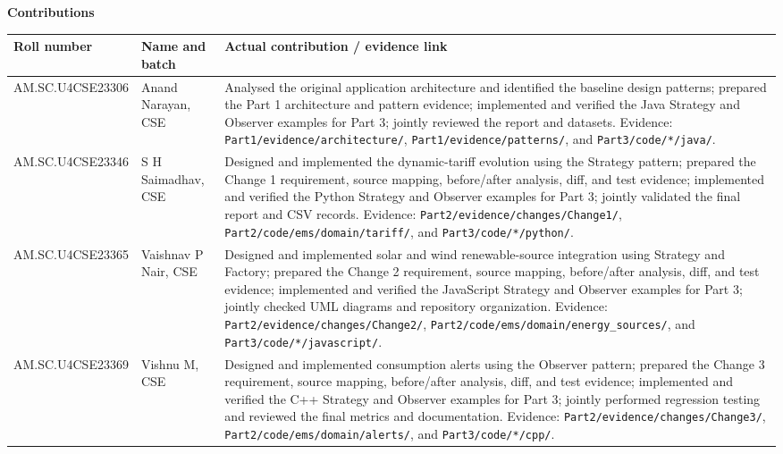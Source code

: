 \documentclass[11pt,a4paper]{article}
\begin{document}
\newpage
\textbf{Contributions}\par
\begin{tabularx}{\linewidth}{@{}llX@{}}
\toprule
Roll number & Name and batch & Actual contribution / evidence link\\
\midrule
AM.SC.U4CSE23306 &
Anand Narayan, CSE &
Analysed the original application architecture and identified the baseline design patterns; prepared the Part 1 architecture and pattern evidence; implemented and verified the Java Strategy and Observer examples for Part 3; jointly reviewed the report and datasets.
Evidence: \texttt{Part1/evidence/architecture/}, \texttt{Part1/evidence/patterns/}, and \texttt{Part3/code/*/java/}.\\

AM.SC.U4CSE23346 &
S H Saimadhav, CSE &
Designed and implemented the dynamic-tariff evolution using the Strategy pattern; prepared the Change 1 requirement, source mapping, before/after analysis, diff, and test evidence; implemented and verified the Python Strategy and Observer examples for Part 3; jointly validated the final report and CSV records.
Evidence: \texttt{Part2/evidence/changes/Change1/}, \texttt{Part2/code/ems/domain/tariff/}, and \texttt{Part3/code/*/python/}.\\

AM.SC.U4CSE23365 &
Vaishnav P Nair, CSE &
Designed and implemented solar and wind renewable-source integration using Strategy and Factory; prepared the Change 2 requirement, source mapping, before/after analysis, diff, and test evidence; implemented and verified the JavaScript Strategy and Observer examples for Part 3; jointly checked UML diagrams and repository organization.
Evidence: \texttt{Part2/evidence/changes/Change2/}, \texttt{Part2/code/ems/domain/energy\_sources/}, and \texttt{Part3/code/*/javascript/}.\\

AM.SC.U4CSE23369 &
Vishnu M, CSE &
Designed and implemented consumption alerts using the Observer pattern; prepared the Change 3 requirement, source mapping, before/after analysis, diff, and test evidence; implemented and verified the C++ Strategy and Observer examples for Part 3; jointly performed regression testing and reviewed the final metrics and documentation.
Evidence: \texttt{Part2/evidence/changes/Change3/}, \texttt{Part2/code/ems/domain/alerts/}, and \texttt{Part3/code/*/cpp/}.\\
\bottomrule
\end{tabularx}
\end{document}
